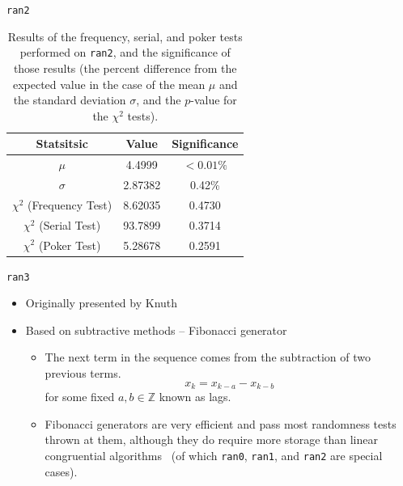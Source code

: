 \documentclass{beamer} %
\begin{document}
\begin{frame}{\texttt{ran2}}
\begin{table}[ht]
\begin{center}
\begin{tabular}{c|c|c} \hline
Statsitsic & Value & Significance\\\hline
$\mu$ & 4.4999 & $<0.01\%$\\
$\sigma$ & 2.87382 & 0.42\%\\
$\chi^{2}$ (Frequency Test) & 8.62035 & 0.4730\\
$\chi^{2}$ (Serial Test) & 93.7899 & 0.3714\\
$\chi^{2}$ (Poker Test) & 5.28678 & 0.2591\\ \hline
\end{tabular}
\caption{Results of the frequency, serial, and poker tests performed on \texttt{ran2}, and the significance of those results (the percent difference from the expected value in the case of the mean $\mu$ and the standard deviation $\sigma$, and the $p$-value for the $\chi^{2}$ tests).}
\label{tab:ran2results}
\end{center}
\end{table}
\end{frame}

\begin{frame}{\texttt{ran3}}
\begin{itemize}
\item Originally presented by Knuth 
\item Based on subtractive methods -- Fibonacci generator
\begin{itemize}
\item  The next term in the sequence comes from the subtraction of two previous terms. 
\begin{equation}
\label{eq:fibgen}
x_{k}=x_{k-a}-x_{k-b}
\end{equation}
for some fixed $a,b\in\mathbb{Z}$ known as lags.  
\item Fibonacci generators are very efficient and pass most randomness tests thrown at them, although they do require more storage than linear congruential algorithms~\cite{fib} (of which \texttt{ran0}, \texttt{ran1}, and \texttt{ran2} are special cases).
\end{itemize}
\end{itemize}
\end{frame}
\end{document}

